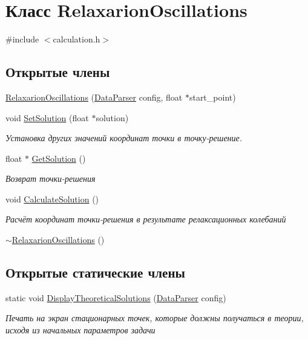 \hypertarget{class_relaxarion_oscillations}{}\section{Класс Relaxarion\+Oscillations}
\label{class_relaxarion_oscillations}


{\ttfamily \#include $<$calculation.\+h$>$}

\subsection*{Открытые члены}
\begin{DoxyCompactItemize}
\item 
\hyperlink{class_relaxarion_oscillations_ade0e59e1059cde99b18be8878736638c}{Relaxarion\+Oscillations} (\hyperlink{class_data_parser}{Data\+Parser} config, float $\ast$start\+\_\+point)
\item 
void \hyperlink{class_relaxarion_oscillations_afb7f1fd0b0d02ca54ae0f9b63e43fb9a}{Set\+Solution} (float $\ast$solution)
\begin{DoxyCompactList}\small\item\em Установка других значений координат точки в точку-\/решение. \end{DoxyCompactList}\item 
float $\ast$ \hyperlink{class_relaxarion_oscillations_ab5e64b9ca53763b51f541ae620134748}{Get\+Solution} ()
\begin{DoxyCompactList}\small\item\em Возврат точки-\/решения \end{DoxyCompactList}\item 
void \hyperlink{class_relaxarion_oscillations_ad5c4c127a5c314536a095ab983471422}{Calculate\+Solution} ()
\begin{DoxyCompactList}\small\item\em Расчёт координат точки-\/решения в результате релаксационных колебаний \end{DoxyCompactList}\item 
\hyperlink{class_relaxarion_oscillations_ae7de123edaf002b2741bc2739eb167f3}{$\sim$\+Relaxarion\+Oscillations} ()
\end{DoxyCompactItemize}
\subsection*{Открытые статические члены}
\begin{DoxyCompactItemize}
\item 
static void \hyperlink{class_relaxarion_oscillations_a3e1a73c2ba6f446e1e425b7ce7ddc07f}{Display\+Theoretical\+Solutions} (\hyperlink{class_data_parser}{Data\+Parser} config)
\begin{DoxyCompactList}\small\item\em Печать на экран стационарных точек, которые должны получаться в теории, исходя из начальных параметров задачи \end{DoxyCompactList}\end{DoxyCompactItemize}


